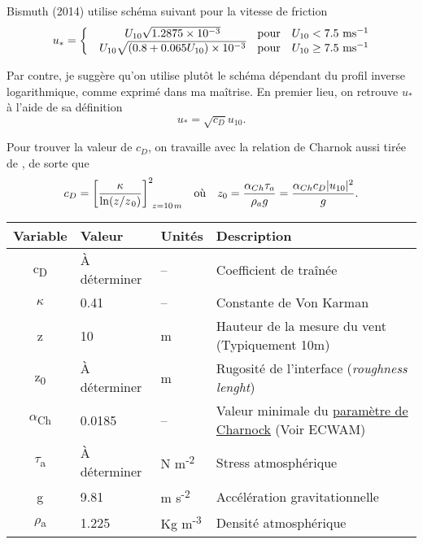 \documentclass[10pt]{article}
\numberwithin{equation}{section}
\newcommand{\pt}{\hspace{1pt}} %
\begin{document}
Bismuth (2014) utilise schéma suivant pour la vitesse de friction
\begin{equation}
   u_* = \left\lbrace \begin{matrix}
     &U_{10}\sqrt{1.2875\times10^{-3}} & \text{pour}\quad U_{10} < 7.5\ \mathrm{ms}^{-1}\\
     &U_{10}\sqrt{\qty(0.8+0.065U_{10})\times10^{-3}} & \text{pour}\quad U_{10}\geq 7.5\ \mathrm{ms}^{-1}\\
   \end{matrix}\right.
\end{equation}




Par contre, je suggère qu'on utilise plutôt le schéma dépendant du profil inverse logarithmique, comme exprimé dans ma maîtrise.
En premier lieu, on retrouve \(u_*\) à l'aide de sa définition
\begin{equation}
   u_* = \sqrt{c_D} u_{10}.
\end{equation}


Pour trouver la valeur de \(c_D\), on travaille avec la relation de Charnok \autocite{charnock1955wind} aussi tirée de \Textcite[p.30]{gill-atmosphere-ocean}, de sorte que 
\begin{align}
\label{eq:orge7515bd}
   &&c_D = \qty[\frac{\kappa}{\ln(z/z_{\pt0})}]_{\ z=10\pt m}^2
   && \text{où} &&
   z_0 = \frac{\alpha_{Ch}\tau_a}{\rho_a g} = \frac{\alpha_{Ch} c_D |u_{10}|^2}{g}. &&
\end{align}

\begin{center}
\begin{tabular}{clll}
Variable & Valeur & Unités & Description\\
\hline
c\textsubscript{D} & À déterminer & -- & Coefficient de traînée\\
\(\kappa\) & 0.41 & -- & Constante de Von Karman\\
z & 10 & m & Hauteur de la mesure du vent (Typiquement 10m)\\
z\textsubscript{0} & À déterminer & m & Rugosité de l'interface (\emph{roughness lenght})\\
\(\alpha\)\textsubscript{Ch} & 0.0185 & -- & Valeur minimale du \href{https://codes.ecmwf.int/grib/param-db/148}{paramètre de Charnock} (Voir ECWAM)\\
\(\tau\)\textsubscript{a} & À déterminer & N m\textsuperscript{-2} & Stress atmosphérique\\
g & 9.81 & m s\textsuperscript{-2} & Accélération gravitationnelle\\
\(\rho\)\textsubscript{a} & 1.225 & Kg m\textsuperscript{-3} & Densité atmosphérique\\
\end{tabular}
\end{center}
\end{document}
